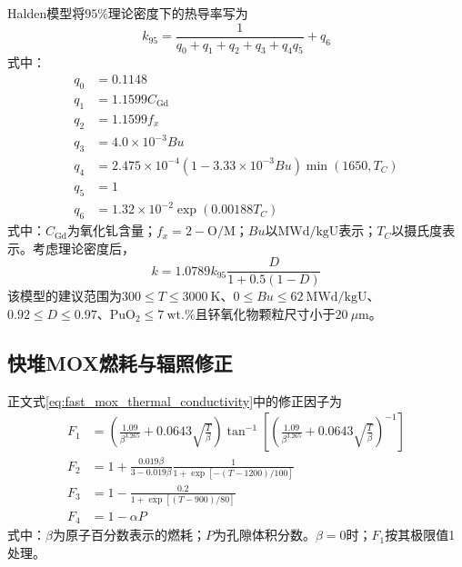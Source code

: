 Halden模型将$95\%$理论密度下的热导率写为
\begin{equation}
	k_{95}=
	\frac{1}{q_0+q_1+q_2+q_3+q_4q_5}+q_6
	\label{eq:appendix_halden_k95}
\end{equation}
\noindent 式中：
\begin{equation}
	\begin{aligned}
		q_0&=0.1148\\
				q_1&=1.1599C_{\mathrm{Gd}}\\
				q_2&=1.1599f_x\\
				q_3&=4.0\times10^{-3}Bu\\
				q_4&=2.475\times10^{-4}
				\left(1-3.33\times10^{-3}Bu\right)
				\min(1650,T_C)\\
				q_5&=1\\
				q_6&=1.32\times10^{-2}\exp(0.00188T_C)
	\end{aligned}
	\label{eq:appendix_halden_terms}
\end{equation}
\label{eq:appendix_halden_q0}
\label{eq:appendix_halden_q1}
\label{eq:appendix_halden_q2}
\label{eq:appendix_halden_q3}
\label{eq:appendix_halden_q4}
\label{eq:appendix_halden_q5}
\label{eq:appendix_halden_q6}
\noindent 式中：$C_{\mathrm{Gd}}$为氧化钆含量；$f_x=2-\mathrm{O/M}$；$Bu$以$\mathrm{MWd/kgU}$表示；$T_C$以摄氏度表示。考虑理论密度后，
\begin{equation}
	k=1.0789k_{95}\frac{D}{1+0.5(1-D)}
	\label{eq:appendix_halden_density_correction}
\end{equation}
该模型的建议范围为$300\leq T\leq3000\ \mathrm{K}$、$0\leq Bu\leq62\ \mathrm{MWd/kgU}$、$0.92\leq D\leq0.97$、$\mathrm{PuO}_2\leq7\ \mathrm{wt.\%}$且钚氧化物颗粒尺寸小于$20\ \mu\mathrm{m}$。

\subsection{快堆MOX燃耗与辐照修正}

正文式\eqref{eq:fast_mox_thermal_conductivity}中的修正因子为
\begin{equation}
	\begin{aligned}
		F_1&=
				\left(
				\frac{1.09}{\beta^{3.265}}
				+0.0643\sqrt{\frac{T}{\beta}}
				\right)
				\tan^{-1}\!\left[
				\left(
				\frac{1.09}{\beta^{3.265}}
				+0.0643\sqrt{\frac{T}{\beta}}
				\right)^{-1}
				\right]
				\\
				F_2&=1+
				\frac{0.019\beta}{3-0.019\beta}
				\frac{1}{1+\exp[-(T-1200)/100]}
				\\
				F_3&=1-
				\frac{0.2}{1+\exp[(T-900)/80]}
				\\
				F_4&=1-\alpha P
	\end{aligned}
	\label{eq:appendix_fast_mox_correction_factors}
\end{equation}
\label{eq:appendix_fast_mox_F1}
\label{eq:appendix_fast_mox_F2}
\label{eq:appendix_fast_mox_F3}
\label{eq:appendix_fast_mox_F4}
\noindent 式中：$\beta$为原子百分数表示的燃耗；$P$为孔隙体积分数。$\beta=0$时；$F_1$按其极限值1处理。

